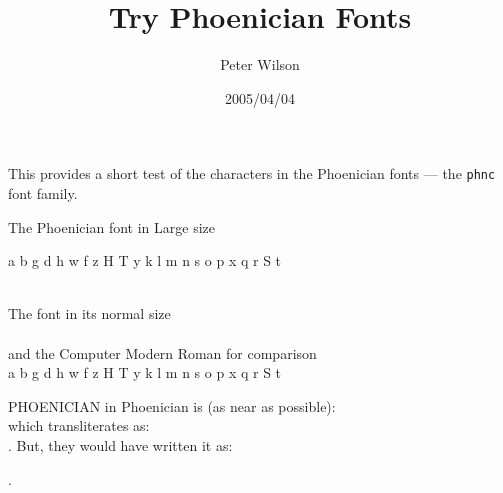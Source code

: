 \documentclass{article}
\title{Try Phoenician Fonts}
\author{Peter Wilson}
\date{2005/04/04}
\newcommand{\abc}{a b g d h w f z H T y k l m n s o p x q r S t}
\newcommand{\cba}{\ARt\
                  \ARsv\
                  \ARr\
                  \ARq\
                  \ARsd\
                  \ARp\
                  \ARo\
                  \ARs\
                  \ARn\
                  \ARm\
                  \ARl\
                  \ARk\
                  \ARy\
                  \ARtd\
                  \ARhd\
                  \ARz\
                  \ARf\
                  \ARw\
                  \ARh\
                  \ARd\
                  \ARg\
                  \ARb\
                  \ARa}
\begin{document}
\maketitle

    This provides a short test of the characters in the Phoenician fonts
--- the \verb|phnc| font family.

\begin{center}
The Phoenician font in Large size \\
{\phncfamily\Large \abc\\ \cba \par}
\end{center}

\begin{center}
The font in its normal size \\
\textphnc{\abc} \\
and the Computer Modern Roman for comparison \\
\abc
\end{center}

    PHOENICIAN in Phoenician is (as near as possible): \\
\textphnc{phongan} which transliterates as: \\
\translitphnc{\Ap\Ah\Ao\An\Ag\Aa\An}. But, they would have written it as: \\
\begin{flushright} .\textphnc{\ARn\ARa\ARg\ARn\ARo\ARh\ARp} \end{flushright}
\end{document}
